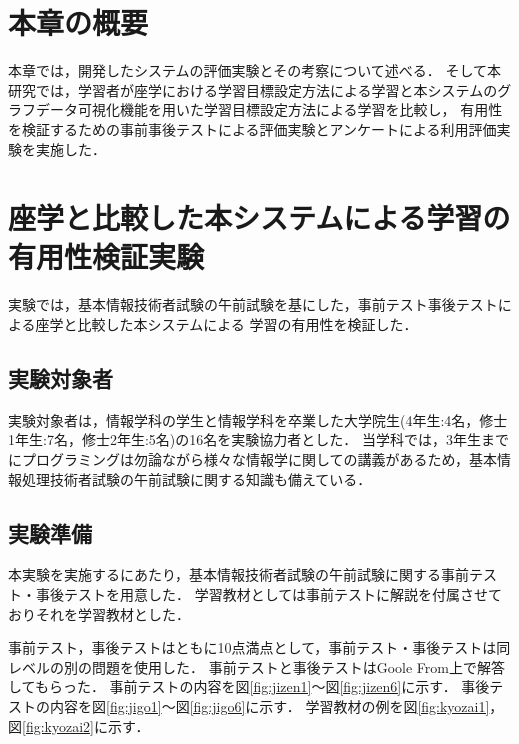 \section{本章の概要}
本章では，開発したシステムの評価実験とその考察について述べる．
そして本研究では，学習者が座学における学習目標設定方法による学習と本システムのグラフデータ可視化機能を用いた学習目標設定方法による学習を比較し，
有用性を検証するための事前事後テストによる評価実験とアンケートによる利用評価実験を実施した．

\section{座学と比較した本システムによる学習の有用性検証実験}
実験では，基本情報技術者試験の午前試験を基にした，事前テスト事後テストによる座学と比較した本システムによる
学習の有用性を検証した．

\subsection{実験対象者}
実験対象者は，情報学科の学生と情報学科を卒業した大学院生(4年生:4名，修士1年生:7名，修士2年生:5名)の16名を実験協力者とした．
当学科では，3年生までにプログラミングは勿論ながら様々な情報学に関しての講義があるため，基本情報処理技術者試験の午前試験に関する知識も備えている．

\subsection{実験準備}
本実験を実施するにあたり，基本情報技術者試験の午前試験に関する事前テスト・事後テストを用意した．
学習教材としては事前テストに解説を付属させておりそれを学習教材とした．

事前テスト，事後テストはともに10点満点として，事前テスト・事後テストは同レベルの別の問題を使用した．
事前テストと事後テストはGoole From上で解答してもらった．
事前テストの内容を図\ref{fig:jizen1}～図\ref{fig:jizen6}に示す．
事後テストの内容を図\ref{fig:jigo1}～図\ref{fig:jigo6}に示す．
学習教材の例を図\ref{fig:kyozai1}，図\ref{fig:kyozai2}に示す．

